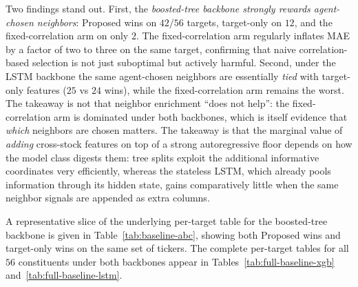 \documentclass[12pt,a4paper,titlepage]{article}
\begin{document}
Two findings stand out. First, the \emph{boosted-tree backbone strongly rewards agent-chosen neighbors}: Proposed wins on \(42/56\) targets, target-only on \(12\), and the fixed-correlation arm on only \(2\). The fixed-correlation arm regularly inflates MAE by a factor of two to three on the same target, confirming that naive correlation-based selection is not just suboptimal but actively harmful. Second, under the LSTM backbone the same agent-chosen neighbors are essentially \emph{tied} with target-only features (\(25\) vs \(24\) wins), while the fixed-correlation arm remains the worst. The takeaway is not that neighbor enrichment ``does not help'': the fixed-correlation arm is dominated under both backbones, which is itself evidence that \emph{which} neighbors are chosen matters. The takeaway is that the marginal value of \emph{adding} cross-stock features on top of a strong autoregressive floor depends on how the model class digests them: tree splits exploit the additional informative coordinates very efficiently, whereas the stateless LSTM, which already pools information through its hidden state, gains comparatively little when the same neighbor signals are appended as extra columns.

A representative slice of the underlying per-target table for the boosted-tree backbone is given in Table~\ref{tab:baseline-abc}, showing both Proposed wins and target-only wins on the same set of tickers. The complete per-target tables for all \(56\) constituents under both backbones appear in Tables~\ref{tab:full-baseline-xgb} and~\ref{tab:full-baseline-lstm}.
\end{document}

